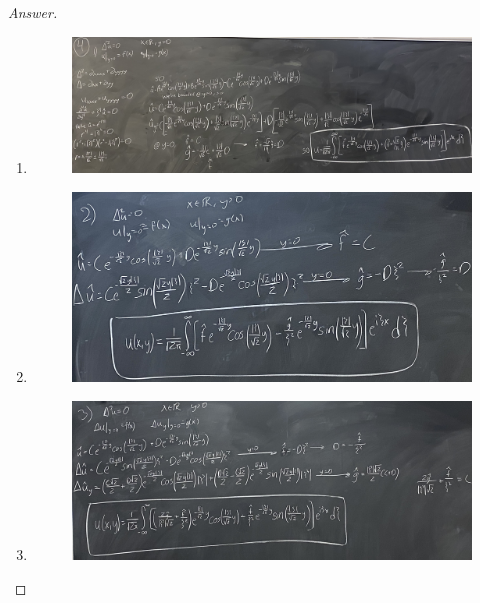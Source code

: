 \documentclass{article}
\theoremstyle{definition}
\renewcommand\qedsymbol{$\blacksquare$}
\newenvironment{ans}{\begin{proof}[Answer]\renewcommand{\qedsymbol}{}}{\end{proof}}
\begin{document}
\begin{ans}
    \begin{enumerate}
        \item \phantom{.}
        \begin{figure}[H]
            \centering
            \includegraphics[width = 1\textwidth]{Problem 4 Part 1.jpeg}
        \end{figure}

        \item \phantom{.}
        \begin{figure}[H]
            \centering
            \includegraphics[width = 1\textwidth]{Problem 4 Part 2.jpeg}
        \end{figure}

        \item \phantom{.}
        \begin{figure}[H]
            \centering
            \includegraphics[width = 1\textwidth]{Problem 4 Part 3.jpeg}
        \end{figure}
    \end{enumerate}
\end{ans}
\end{document}
